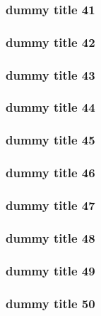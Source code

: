 \begin{frame} \frametitle{dummy title 41} \end{frame}
\begin{frame} \frametitle{dummy title 42} \end{frame}
\begin{frame} \frametitle{dummy title 43} \end{frame}
\begin{frame} \frametitle{dummy title 44} \end{frame}
\begin{frame} \frametitle{dummy title 45} \end{frame}
\begin{frame} \frametitle{dummy title 46} \end{frame}
\begin{frame} \frametitle{dummy title 47} \end{frame}
\begin{frame} \frametitle{dummy title 48} \end{frame}
\begin{frame} \frametitle{dummy title 49} \end{frame}
\begin{frame} \frametitle{dummy title 50} \end{frame}



